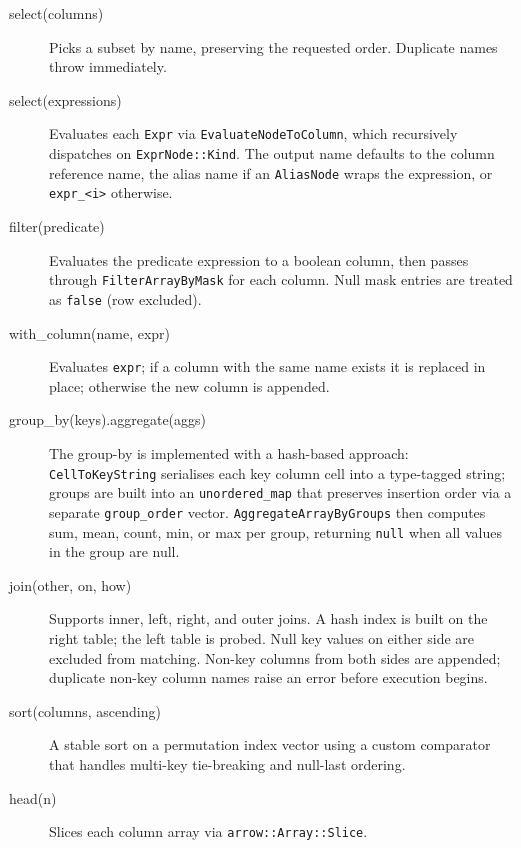 \documentclass[12pt,a4paper]{article}
\begin{document}
\begin{description}
  \item[select(columns)] Picks a subset by name, preserving the requested
        order.  Duplicate names throw immediately.

  \item[select(expressions)] Evaluates each \texttt{Expr} via
        \texttt{EvaluateNodeToColumn}, which recursively dispatches on
        \texttt{ExprNode::Kind}.  The output name defaults to the column
        reference name, the alias name if an \texttt{AliasNode} wraps the
        expression, or \texttt{expr\_<i>} otherwise.

  \item[filter(predicate)] Evaluates the predicate expression to a
        boolean column, then passes through \texttt{FilterArrayByMask}
        for each column.  Null mask entries are treated as \texttt{false}
        (row excluded).

  \item[with\_column(name, expr)] Evaluates \texttt{expr}; if a column
        with the same name exists it is replaced in place; otherwise the
        new column is appended.

  \item[group\_by(keys).aggregate(aggs)] The group-by is implemented with
        a hash-based approach: \texttt{CellToKeyString} serialises each
        key column cell into a type-tagged string; groups are built into an
        \texttt{unordered\_map} that preserves insertion order via a
        separate \texttt{group\_order} vector.
        \texttt{AggregateArrayByGroups} then computes sum, mean, count,
        min, or max per group, returning \texttt{null} when all values in
        the group are null.

  \item[join(other, on, how)] Supports inner, left, right, and outer joins.
        A hash index is built on the right table; the left table is probed.
        Null key values on either side are excluded from matching.
        Non-key columns from both sides are appended; duplicate non-key
        column names raise an error before execution begins.

  \item[sort(columns, ascending)] A stable sort on a permutation index
        vector using a custom comparator that handles multi-key tie-breaking
        and null-last ordering.

  \item[head(n)] Slices each column array via \texttt{arrow::Array::Slice}.
\end{description}
\end{document}
